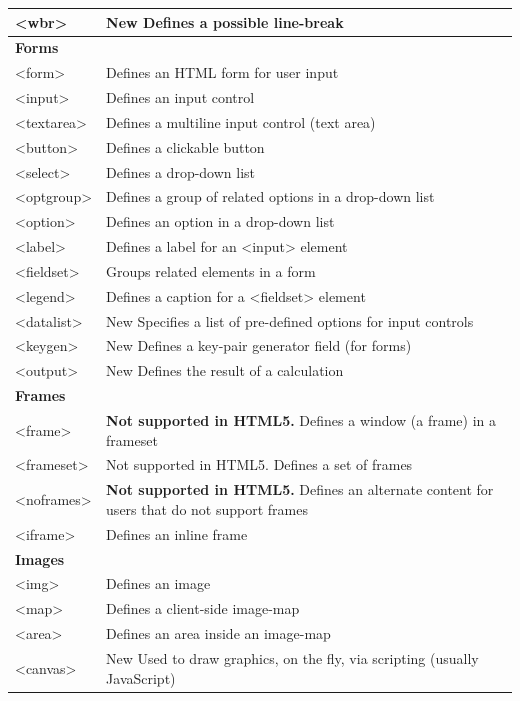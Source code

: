 \documentclass[a4paper,oneside]{book}
\begin{document}
\begin{longtable}[H]{| p{5cm} | p{10cm} |}
<wbr>	& New	Defines a possible line-break \\ \hline
\multicolumn{2}{|l|}{\textbf{Forms}}	  \\ \hline 
<form>		& Defines an HTML form for user input \\ \hline 
<input>		& Defines an input control \\ \hline 
<textarea>		& Defines a multiline input control (text area) \\ \hline 
<button>		& Defines a clickable button \\ \hline 
<select>		& Defines a drop-down list \\ \hline 
<optgroup>		& Defines a group of related options in a drop-down list \\ \hline 
<option>		& Defines an option in a drop-down list \\ \hline 
<label>		& Defines a label for an <input> element \\ \hline 
<fieldset>		& Groups related elements in a form \\ \hline 
<legend>		& Defines a caption for a <fieldset> element \\ \hline 
<datalist>	& New	Specifies a list of pre-defined options for input controls \\ \hline 
<keygen>	& New	Defines a key-pair generator field (for forms) \\ \hline 
<output>	& New	Defines the result of a calculation \\ \hline
\multicolumn{2}{|l|}{\textbf{Frames}}	 \\ \hline 
<frame>		& \textbf{Not supported in HTML5.}
Defines a window (a frame) in a frameset \\ \hline 
<frameset>		& Not supported in HTML5.
Defines a set of frames \\ \hline 
<noframes>		& \textbf{Not supported in HTML5.}
Defines an alternate content for users that do not support frames \\ \hline 
<iframe>	& 	Defines an inline frame \\ \hline
\multicolumn{2}{|l|}{\textbf{Images}}	  \\ \hline 
<img>		& Defines an image \\ \hline 
<map>		& Defines a client-side image-map \\ \hline 
<area>		& Defines an area inside an image-map \\ \hline 
<canvas>	& New	Used to draw graphics, on the fly, via scripting (usually JavaScript) \\ \hline 

\end{longtable}
\end{document}
